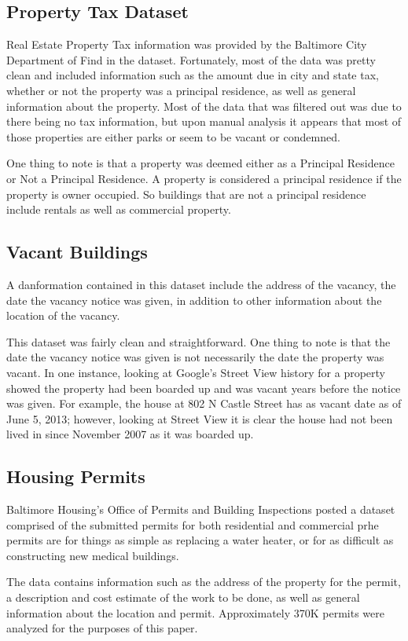 \documentclass[conference]{IEEEtran}
\begin{document}
\subsection{Property Tax Dataset}
Real Estate Property Tax information was provided by the Baltimore City Department of Find in the dataset.
Fortunately, most of the data was pretty clean and included information such as the amount due in city and state tax,
whether or not the property was a principal residence, as well as general information about the property.  Most of the
data that was filtered out was due to there being no tax information, but upon manual analysis it appears that most of those properties are
either parks or seem to be vacant or condemned.

One thing to note is that a property was deemed either as a Principal Residence or Not a Principal Residence.  A property
is considered a principal residence if the property is owner occupied. So buildings that are not a principal residence
include rentals as well as commercial property.


\subsection{Vacant Buildings}
A danformation contained in this dataset include the address of the vacancy, the date the vacancy notice was given,
in addition to other information about the location of the vacancy.

This dataset was fairly clean and straightforward.  One thing to note is that the date the vacancy notice was given is not necessarily the date the property was vacant.
In one instance, looking at Google's Street View history for a property showed the property had been boarded up and
was vacant years before the notice was given. For example, the house at 802 N Castle Street has as vacant date as of June 5, 2013; however, looking at
Street View it is clear the house had not been lived in since November 2007 as it was boarded up.


\subsection{Housing Permits}
Baltimore Housing's Office of Permits and Building Inspections posted a dataset comprised of the submitted permits for
both residential and commercial prhe permits are for things as simple as replacing a water heater, or for as
difficult as constructing new medical buildings.

The data contains information such as the address of the property for the permit, a description and cost estimate of the work to be done,
as well as general information about the location and permit.  Approximately 370K permits were analyzed for the purposes
of this paper.
\end{document}
